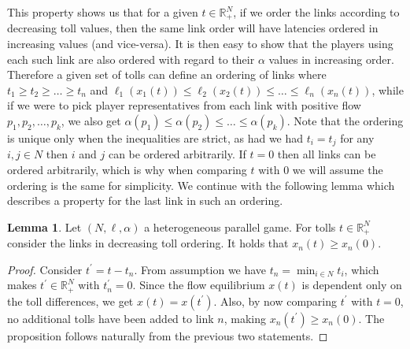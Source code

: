 \documentclass[10pt,a4paper]{book}
\newcommand{\R}{\mathbb{R}}
\theoremstyle{definition}
\newtheorem{lemma}[definition]{Lemma}
\theoremstyle{comment}
\begin{document}
This property shows us that for a given $t \in \R_+^N$, if we order the links according to decreasing toll values, then the same link order will have latencies ordered in increasing values (and vice-versa).
It is then easy to show that the players using each such link are also ordered with regard to their $\alpha$ values in increasing order.
Therefore a given set of tolls can define an ordering of links where $t_1 \ge t_2 \ge \dots \ge t_n$ and $\ell_1(x_1(t)) \le \ell_2(x_2(t)) \le \dots \le \ell_n(x_n(t))$, while if we were to pick player representatives from each link with positive flow $p_1, p_2, \dots, p_k$, we also get $\alpha(p_1) \le \alpha(p_2) \le \dots \le \alpha(p_k)$.
Note that the ordering is unique only when the inequalities are strict, as had we had $t_i = t_j$ for any $i, j \in N$ then $i$ and $j$ can be ordered arbitrarily.
If $t = 0$ then all links can be ordered arbitrarily, which is why when comparing $t$ with $0$ we will assume the ordering is the same for simplicity.
We continue with the following lemma which describes a property for the last link in such an ordering.

\begin{lemma}
	\label{lemma:xn_xn0_lower_bound}
	Let $(N, \ell, \alpha)$ a heterogeneous parallel game.
	For tolls $t \in \R_+^N$ consider the links in decreasing toll ordering.
	It holds that $x_n(t) \ge x_n(0)$.
\end{lemma}

\begin{proof}
	Consider $t^\prime = t - t_n$.
	From assumption we have $t_n = \min_{i \in N} t_i$, which makes $t^\prime \in \R_+^N$ with $t_n^\prime = 0$.
	Since the flow equilibrium $x(t)$ is dependent only on the toll differences, we get $x(t) = x(t^\prime)$.
	Also, by now comparing $t^\prime$ with $t = 0$, no additional tolls have been added to link $n$, making $x_n(t^\prime) \ge x_n(0)$.
	The proposition follows naturally from the previous two statements.
\end{proof}
\end{document}
